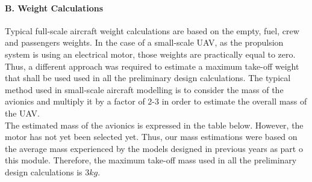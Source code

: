 \documentclass[12pt]{article}
\begin{document}
\paragraph{B. Weight Calculations}
Typical full-scale aircraft weight calculations are based on the empty, fuel, crew and passengers weights. In the case of a small-scale UAV, as the propulsion system is using an electrical motor, those weights are practically equal to zero. Thus, a different approach was required to estimate a maximum take-off weight that shall be used used in all the preliminary design calculations. The typical method used in small-scale aircraft modelling is to consider the mass of the avionics and multiply it by a factor of 2-3 in order to estimate the overall mass of the UAV. \\ 

\noindent The estimated mass of the avionics is expressed in the table below. However, the motor has not yet been selected yet. Thus, our mass estimations were based on the average mass experienced by the models designed in previous years as part o this module. Therefore, the maximum take-off mass used in all the preliminary design calculations is $3kg$. \\
\end{document}
